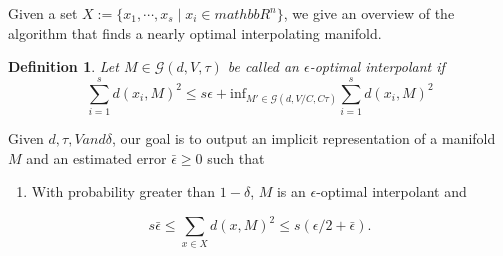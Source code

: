 \documentclass{ujarticle}
\newtheorem{dfn}[thm]{Definition}
\begin{document}
Given a set $X := \{x_1, \cdots , x_s \mid  x_i \in mathbb{R}^n \}$,  we give an overview of the algorithm that finds a nearly
optimal interpolating manifold.

\begin{dfn}
 Let $M \in \mathcal{G}(d,V,\tau)$ be called an $\epsilon$-optimal interpolant if
 \begin{equation*}
  \sum_{i=1}^sd(x_i,M)^2 \le s\epsilon + \mathrm{inf}_{M' \in \mathcal{G}(d,V/C,C \tau )}  \sum_{i=1}^sd(x_i,M)^2
 \end{equation*}
\end{dfn}

Given $d,\tau,V and  \delta$, our goal is to output an implicit representation of a manifold $M$ and an estimated
error $\bar{\epsilon} \ge 0$ such that
\begin{enumerate}
  \item With probability greater than $1 - \delta$, $M$ is an $\epsilon$-optimal interpolant and
\end{enumerate}
\begin{equation*}
 s \bar{\epsilon} \le \sum_{x \in X}d(x,M)^2 \le s(\epsilon/2 + \bar{\epsilon}).
\end{equation*}
\end{document}
